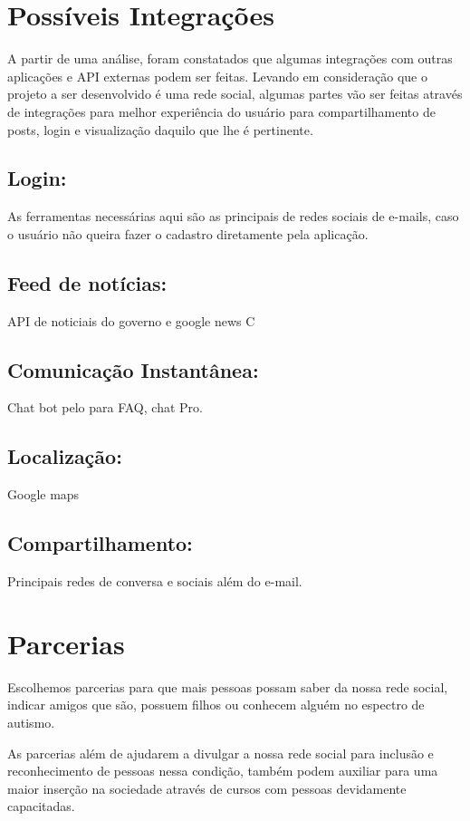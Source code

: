 \documentclass[
    12pt,               %
    openright,          %
    oneside,
    a4paper,            %
    paginasA3,  %
    BIBLATEX,           %
    REFINDENT,          %
    MODELO,             %
    TODO,               %
    english,            %
    brazil              %
    ]{ifsp-spo-inf-ctds} %
\begin{document}
\begin{apendicesenv}
\section{Possíveis Integrações}
A partir de uma análise, foram constatados que algumas integrações com outras aplicações e API externas podem ser feitas. Levando em consideração que o projeto a ser desenvolvido é uma rede social, algumas partes vão ser feitas através de integrações para melhor experiência do usuário para compartilhamento de posts, login e visualização daquilo que lhe é pertinente. 

\subsection{Login:}
As ferramentas necessárias aqui são as principais de redes sociais de e-mails, caso o usuário não queira fazer o cadastro diretamente pela aplicação. 
\subsection{Feed de notícias:}
API de noticiais do governo e google news C
\subsection{Comunicação Instantânea:}
Chat bot pelo para FAQ, chat Pro. 
\subsection{Localização:}
Google maps
\subsection{Compartilhamento:}
Principais redes de conversa e sociais além do e-mail. 

\section{Parcerias}
Escolhemos parcerias para que mais pessoas possam saber da nossa rede social, indicar amigos que são, possuem filhos ou conhecem alguém no espectro de autismo.

As parcerias além de ajudarem a divulgar a nossa rede social para inclusão e reconhecimento de pessoas nessa condição, também podem auxiliar para uma maior inserção na sociedade através de cursos com pessoas devidamente capacitadas.


\end{apendicesenv}
\end{document}
